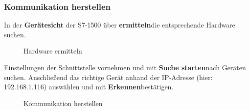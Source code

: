 \clearpage

\subsubsection{Kommunikation herstellen}
In der \textbf{Gerätesicht} der S7-1500 über \glqq\textbf{ermitteln}\grqq\:die entsprechende Hardware suchen.
\begin{figure}[H]
   \centering
   \caption[Hardware ermitteln]{Hardware ermitteln}
   \label{fig:Bild3.3}
\end{figure}

Einstellungen der Schnittstelle vornehmen und mit \glqq\textbf{Suche starten}\grqq\:nach Geräten suchen. Anschließend das richtige Gerät anhand der IP-Adresse (hier: 192.168.1.116) auswählen und mit \glqq\textbf{Erkennen}\grqq\:bestätigen.
\begin{figure}[H]
   \centering
   \caption[Kommunikation herstellen]{Kommunikation herstellen}
   \label{fig:Bild3.4}
\end{figure}

